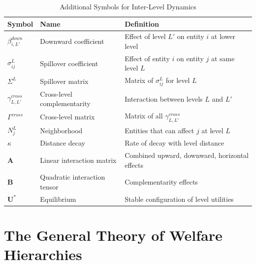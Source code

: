 \begin{table}[htbp]
\centering
\caption{Additional Symbols for Inter-Level Dynamics}
\label{tab:aaa-extended-symbols}
\renewcommand{\arraystretch}{1.3}
\begin{tabular}{@{}lll@{}}
\toprule
\textbf{Symbol} & \textbf{Name} & \textbf{Definition} \\
\midrule
$\beta^{down}_{i,L'}$ & Downward coefficient & Effect of level $L'$ on entity $i$ at lower level \\
$\sigma^L_{ij}$ & Spillover coefficient & Effect of entity $i$ on entity $j$ at same level $L$ \\
$\Sigma^L$ & Spillover matrix & Matrix of $\sigma^L_{ij}$ for level $L$ \\
$\gamma^{cross}_{L,L'}$ & Cross-level complementarity & Interaction between levels $L$ and $L'$ \\
$\Gamma^{cross}$ & Cross-level matrix & Matrix of all $\gamma^{cross}_{L,L'}$ \\
$N^L_j$ & Neighborhood & Entities that can affect $j$ at level $L$ \\
$\kappa$ & Distance decay & Rate of decay with level distance \\
$\mathbf{A}$ & Linear interaction matrix & Combined upward, downward, horizontal effects \\
$\mathbf{B}$ & Quadratic interaction tensor & Complementarity effects \\
$\mathbf{U}^*$ & Equilibrium & Stable configuration of level utilities \\
\bottomrule
\end{tabular}
\end{table}


\section{The General Theory of Welfare Hierarchies}
\label{sec:gtwh}

